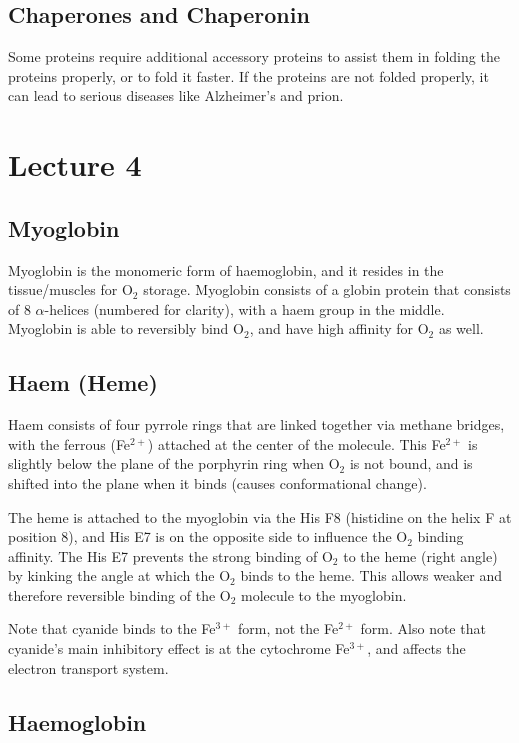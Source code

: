 \documentclass[a4paper, 12pt]{report}
\newcommand{\mychapter}[2]{
    \setcounter{chapter}{#1}
    \setcounter{section}{0}
    \chapter*{#2}
    \addcontentsline{toc}{chapter}{#2}
}
\begin{document}
\section{Chaperones and Chaperonin}

Some proteins require additional accessory proteins to assist them in folding the proteins properly, or to fold it faster.
If the proteins are not folded properly, it can lead to serious diseases like Alzheimer's and prion.

\mychapter{4}{Lecture 4}

\section{Myoglobin}

Myoglobin is the monomeric form of haemoglobin, and it resides in the tissue/muscles for O$_2$ storage.
Myoglobin consists of a globin protein that consists of 8 $\alpha$-helices (numbered for clarity), with a haem group in the middle.
Myoglobin is able to reversibly bind O$_2$, and have high affinity for O$_2$ as well.

\section{Haem (Heme)}

Haem consists of four pyrrole rings that are linked together via methane bridges, with the ferrous (Fe$^{2+}$) attached at the center of the molecule.
This Fe$^{2+}$ is slightly below the plane of the porphyrin ring when O$_2$ is not bound, and is shifted into the plane when it binds (causes conformational change).

The heme is attached to the myoglobin via the His F8 (histidine on the helix F at position 8), and His E7 is on the opposite side to influence the O$_2$ binding affinity.
The His E7 prevents the strong binding of O$_2$ to the heme (right angle) by kinking the angle at which the O$_2$ binds to the heme.
This allows weaker and therefore reversible binding of the O$_2$ molecule to the myoglobin.

Note that cyanide binds to the Fe$^{3+}$ form, not the Fe$^{2+}$ form.
Also note that cyanide's main inhibitory effect is at the cytochrome Fe$^{3+}$, and affects the electron transport system.

\section{Haemoglobin}
\end{document}
